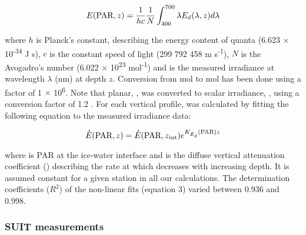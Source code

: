 \begin{linenomath*}
    \begin{equation}
		E(\textnormal{PAR}, z){} = \frac{1}{hc} \frac{1}{N} \int_{400}^{700} \lambda E_d(\lambda, z)d\lambda
	\end{equation}
\end{linenomath*}

\noindent where $h$ is Planck's constant, describing the energy content of quanta (6.623 $\times$ 10\textsuperscript{-34} J s), $c$ is the constant speed of light (299 792 458 m s\textsuperscript{-1}), $N$ is the Avogadro's number (6.022 $\times$ 10\textsuperscript{23} mol\textsuperscript{-1}) and \edlambdaz{} is the measured irradiance at wavelength $\lambda$ (nm) at depth $z$. Conversion from mol to \textmu mol has been done using a factor of 1 $\times$ 10\textsuperscript{6}. Note that planar, \epar{}, was converted to scalar irradiance, \eparscalar{}, using a conversion factor of 1.2 \citep{Toole2003}. For each vertical \eparscalar{} profile, \kdparscalar{} was calculated by fitting the following equation to the measured irradiance data:

\begin{linenomath*}
    \begin{equation}
		\mathring{E}(\textnormal{PAR}, z){} = \mathring{E}(\textnormal{PAR}, z\textsubscript{int}){} e^{K_{\mathring{E}_d}(\textnormal{PAR}){}z}
	\end{equation}
\end{linenomath*}

where \eparzintscalar{} is PAR at the ice-water interface and \kdparscalar{} is the diffuse vertical attenuation coefficient (\mminus{}) describing the rate at which \eparscalar{} decreases with increasing depth. It is assumed constant for a given station in all our calculations. The determination coefficients ($R^2$) of the non-linear fits (equation 3) varied between 0.936 and 0.998.

\subsubsection{SUIT measurements}


